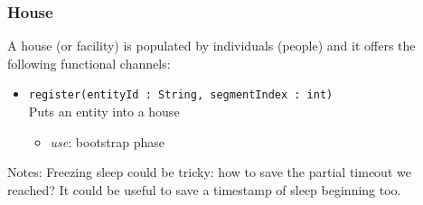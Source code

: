 \subsubsection{House}
A house (or facility) is populated by individuals (people) and it offers the following functional channels:
\begin{itemize}
	\item \texttt{register(entityId : String, segmentIndex : int)}
	\\Puts an entity into a house
	\begin{itemize}
		\item \textit{use}: bootstrap phase
	\end{itemize}
\end{itemize}
Notes:
Freezing sleep could be tricky: how to save the partial timeout we reached? It could be useful to save a timestamp of sleep beginning too.